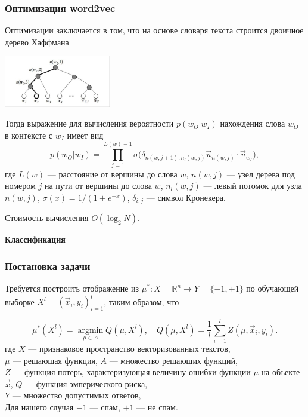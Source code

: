 \documentclass[compress,professionalfont]{beamer}
\begin{document}
\begin{frame}
\frametitle{Оптимизация word2vec}

Оптимизации заключается в том, что на основе словаря текста строится двоичное дерево Хаффмана
\begin{center}
\includegraphics[width=0.35\textwidth]{huffman.jpg}
\end{center}

Тогда выражение для вычисления вероятности $p(w_O|w_I)$ нахождения слова $w_O$ в контексте с $w_I$ имеет вид
$$
p(w_O|w_I) = \prod\limits_{j=1}^{L(w)-1} \sigma \Big(\delta_{n(w,j+1), n_l(w,j)} \vec{u}_{n(w,j)} \cdot \vec{v}_{w_I} \Big),
$$
где $L(w)$ --- расстояние от вершины до слова $w$, $n(w, j)$ --- узел дерева под номером $j$ на пути от вершины до слова $w$, $n_l(w,j)$ --- левый потомок для узла $n(w,j)$, $\sigma(x) = 1 / (1 + e^{-x})$, $\delta_{i,j}$ --- символ Кронекера.

Стоимость вычисления $O(\log_2 N)$.

\end{frame}

\begin{frame}

\begin{center}
\Huge\bf Классификация
\end{center}

\end{frame}

\begin{frame}
\frametitle{Постановка задачи}

Требуется построить отображение из $\mu^{*} : X =  \mathbb{R}^n \rightarrow Y = \{-1,+1\}$ по обучающей выборке $X^l = (\vec{x}_i, y_i)_{i=1}^l$, таким образом, что

$$
\mu^{*}\left(X^l\right) = \operatorname*{argmin}_{\mu \in A}  Q\left(\mu, X^l\right), \quad Q\left(\mu, X^l\right) = \dfrac{1}{l} \sum_{i=1}^{l} Z(\mu, \vec{x}_i, y_i).
$$
где $X$ --- признаковое пространство векторизованных текстов, \\
$\mu$ --- решающая функция, $A$ --- множество решающих функций, \\
$Z$ --- функция потерь, характеризующая величину ошибки функции $\mu$ на объекте $\vec{x}$, $Q$ --- функция эмперического риска, \\
$Y$ --- множество допустимых ответов, \\
Для нашего случая $-1$ --- спам, $+1$ --- не спам. \\

\end{frame}
\end{document}
